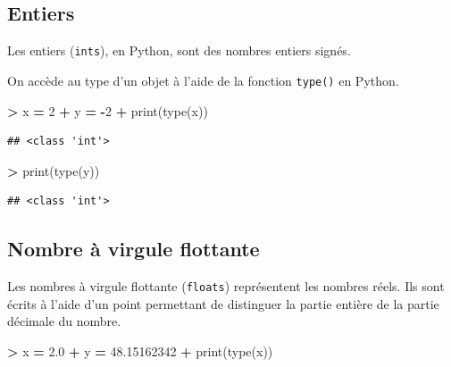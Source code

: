 \documentclass[12pt,]{book}
\newenvironment{Shaded}{\begin{snugshade}}{\end{snugshade}}
\newcommand{\DecValTok}[1]{\textcolor[rgb]{0.00,0.00,0.81}{#1}}
\newcommand{\FloatTok}[1]{\textcolor[rgb]{0.00,0.00,0.81}{#1}}
\newcommand{\OperatorTok}[1]{\textcolor[rgb]{0.81,0.36,0.00}{\textbf{#1}}}
\newcommand{\BuiltInTok}[1]{#1}
\newcommand{\NormalTok}[1]{#1}
\numberwithin{equation}{section}
\numberwithin{countremarque}{section}
\let\BeginKnitrBlock\begin \let\EndKnitrBlock\end
\begin{document}
\subsection{Entiers}\label{entiers}

Les entiers (\texttt{ints}), en Python, sont des nombres entiers signés.

\BeginKnitrBlock{remarque}
On accède au type d'un objet à l'aide de la fonction \texttt{type()} en
Python.
\EndKnitrBlock{remarque}

\begin{Shaded}
\begin{Highlighting}[]
\OperatorTok{>}\NormalTok{ x }\OperatorTok{=} \DecValTok{2}
\OperatorTok{+}\NormalTok{ y }\OperatorTok{=} \OperatorTok{-}\DecValTok{2}
\OperatorTok{+} \BuiltInTok{print}\NormalTok{(}\BuiltInTok{type}\NormalTok{(x))}
\end{Highlighting}
\end{Shaded}

\begin{lstlisting}
## <class 'int'>
\end{lstlisting}

\begin{Shaded}
\begin{Highlighting}[]
\OperatorTok{>} \BuiltInTok{print}\NormalTok{(}\BuiltInTok{type}\NormalTok{(y))}
\end{Highlighting}
\end{Shaded}

\begin{lstlisting}
## <class 'int'>
\end{lstlisting}

\subsection{Nombre à virgule
flottante}\label{nombre-a-virgule-flottante}

Les nombres à virgule flottante (\texttt{floats}) représentent les
nombres réels. Ils sont écrits à l'aide d'un point permettant de
distinguer la partie entière de la partie décimale du nombre.

\begin{Shaded}
\begin{Highlighting}[]
\OperatorTok{>}\NormalTok{ x }\OperatorTok{=} \FloatTok{2.0}
\OperatorTok{+}\NormalTok{ y }\OperatorTok{=} \FloatTok{48.15162342}
\OperatorTok{+} \BuiltInTok{print}\NormalTok{(}\BuiltInTok{type}\NormalTok{(x))}
\end{Highlighting}
\end{Shaded}
\end{document}
